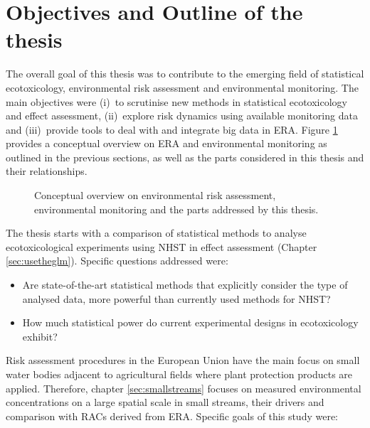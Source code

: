 \clearpage
\section{Objectives and Outline of the thesis}

The overall goal of this thesis was to contribute to the emerging field of statistical ecotoxicology, environmental risk assessment and environmental monitoring.
The main objectives were (i)~to scrutinise new methods in statistical ecotoxicology and effect assessment,
(ii)~explore risk dynamics using available monitoring data and
(iii)~provide tools to deal with and integrate big data in ERA.
Figure \ref{fig:intro:overview} provides a conceptual overview on ERA and environmental monitoring as outlined in the previous sections, as well as the parts considered in this thesis and their relationships. 

\begin{figure}[h]
	\vspace{2em}
    \hspace*{-1cm} 
	\resizebox{1.05\textwidth}{!}{%
		
	}
	\caption[Conceptual overview of the topics addressed by this thesis]{Conceptual overview on environmental risk assessment, environmental monitoring and the parts addressed by this thesis.}
	\label{fig:intro:overview}
\end{figure}
\vspace{2em}

\noindent The thesis starts with a comparison of statistical methods to analyse ecotoxicological experiments using NHST in effect assessment (Chapter \ref{sec:usetheglm}). 
Specific questions addressed were:

\begin{itemize}
	\item Are state-of-the-art statistical methods that explicitly consider the type of analysed data, more powerful than currently used methods for NHST?
	\item How much statistical power do current experimental designs in ecotoxicology exhibit?
\end{itemize}


\noindent Risk assessment procedures in the European Union have the main focus on small water bodies adjacent to agricultural fields where plant protection products are applied.
Therefore, chapter \ref{sec:smallstreams} focuses on measured environmental concentrations on a large spatial scale in small streams, their drivers and comparison with RACs derived from ERA.
Specific goals of this study were:

